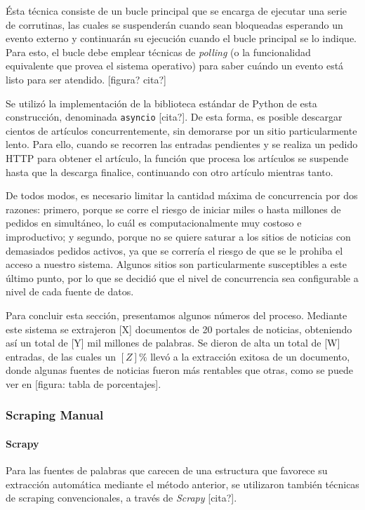 Ésta técnica consiste de un bucle principal que se encarga de ejecutar una serie de corrutinas, las
cuales se suspenderán cuando sean bloqueadas esperando un evento externo y continuarán su ejecución
cuando el bucle principal se lo indique. Para esto, el bucle debe emplear técnicas de
\textit{polling} (o la funcionalidad equivalente que provea el sistema operativo) para saber cuándo
un evento está listo para ser atendido. [figura? cita?]

Se utilizó la implementación de la biblioteca estándar de Python de esta construcción, denominada
\texttt{asyncio} [cita?]. De esta forma, es posible descargar cientos de artículos concurrentemente,
sin demorarse por un sitio particularmente lento. Para ello, cuando se recorren las entradas
pendientes y se realiza un pedido HTTP para obtener el artículo, la función que procesa los
artículos se suspende hasta que la descarga finalice, continuando con otro artículo mientras tanto.

De todos modos, es necesario limitar la cantidad máxima de concurrencia por dos razones: primero,
porque se corre el riesgo de iniciar miles o hasta millones de pedidos en simultáneo, lo cuál es
computacionalmente muy costoso e improductivo; y segundo, porque no se quiere saturar a los sitios
de noticias con demasiados pedidos activos, ya que se correría el riesgo de que se le prohiba el
acceso a nuestro sistema. Algunos sitios son particularmente susceptibles a este último punto, por
lo que se decidió que el nivel de concurrencia sea configurable a nivel de cada fuente de datos.


Para concluir esta sección, presentamos algunos números del proceso. Mediante este sistema se
extrajeron [X] documentos de 20 portales de noticias, obteniendo así un total de [Y] mil millones de
palabras. Se dieron de alta un total de [W] entradas, de las cuales un $[Z]\%$ llevó a la extracción
exitosa de un documento, donde algunas fuentes de noticias fueron más rentables que otras, como se
puede ver en [figura: tabla de porcentajes].


\subsubsection{Scraping Manual}

\paragraph{Scrapy}

Para las fuentes de palabras que carecen de una estructura que favorece su extracción automática
mediante el método anterior, se utilizaron también técnicas de scraping convencionales, a través de
\textit{Scrapy} [cita?].

